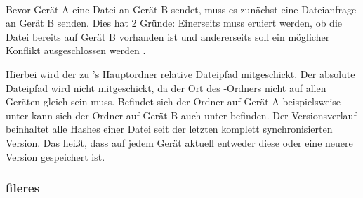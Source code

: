 	\begin{rightwordgroup}{\isprotomsgtype}
	\end{rightwordgroup} \\
	
	\begin{rightwordgroup}{\isprotomsgdata}
		 \\
		\skippedwords \\
		 \\
		 \\
		\skippedwords \\
	\end{rightwordgroup}
Bevor Gerät A eine Datei an Gerät B sendet, muss es zunächst eine Dateianfrage an Gerät B senden. Dies hat 2 Gründe: Einerseits muss eruiert werden, ob die Datei bereits auf Gerät B vorhanden ist und andererseits soll ein möglicher Konflikt  ausgeschlossen werden .

\begin{description} 
		Hierbei wird der zu \sblit's Hauptordner relative Dateipfad mitgeschickt. Der absolute Dateipfad wird nicht mitgeschickt, da der Ort des \sblit-Ordners nicht auf allen Geräten gleich sein muss. Befindet sich der Ordner auf Gerät A beispielsweise unter  kann sich der Ordner auf Gerät B auch unter  befinden.
		Der Versionsverlauf beinhaltet alle Hashes einer Datei seit der letzten komplett synchronisierten Version. Das heißt, dass auf jedem Gerät aktuell entweder diese oder eine neuere Version gespeichert ist.
\end{description}

		
\subsubsection{\gls{fileres}} \label{fileres}

\messagestart
	 \\
	
	\begin{rightwordgroup}{\isprotomsgtype}
	\end{rightwordgroup} \\
	
	\begin{rightwordgroup}{\isprotomsgdata}
		 \\
		 \\
		\skippedwords \\
		 \\
		 \\
		\skippedwords \\
	\end{rightwordgroup}


